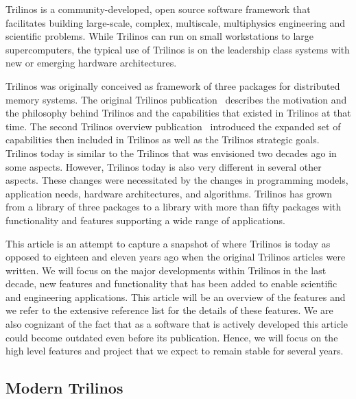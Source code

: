 


Trilinos is a community-developed, open source software framework that facilitates building large-scale, complex, multiscale, multiphysics engineering and scientific problems. While Trilinos can run on small workstations to large supercomputers, the typical use of Trilinos is on the leadership class systems with new or emerging hardware architectures.

Trilinos was originally conceived as framework of three packages for distributed memory systems. The original Trilinos publication~\cite{Heroux2005a} describes the motivation and the philosophy behind Trilinos and the capabilities that existed in Trilinos at that time. The second Trilinos overview publication~\cite{Heroux2012} introduced the expanded set of capabilities then included in Trilinos as well as the Trilinos strategic goals. Trilinos today is similar to the Trilinos that was envisioned two decades ago in some aspects. However, Trilinos today is also very different in several other aspects. These changes were necessitated by the changes in programming models, application needs, hardware architectures, and algorithms. Trilinos has grown from a library of three packages to a library with more than fifty packages with functionality and features supporting a wide range of applications.

This article is an attempt to capture a snapshot of where Trilinos is today as opposed to eighteen and eleven years ago when the original Trilinos articles were written. We will focus on the major developments within Trilinos in the last decade, new features and functionality that has been added to enable scientific and engineering applications. This article will be an overview of the features and we refer to the extensive reference list for the details of these features. We are also cognizant of the fact that as a software that is actively developed this article could become outdated even before its publication. Hence, we will focus on the high level features and project that we expect to remain stable for several years.



\subsection{Modern Trilinos}





